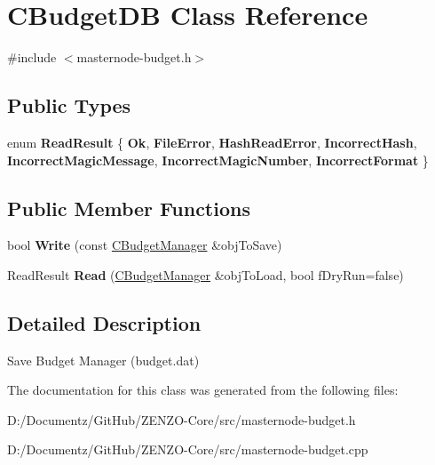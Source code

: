 \hypertarget{class_c_budget_d_b}{}\section{C\+Budget\+DB Class Reference}
\label{class_c_budget_d_b}


{\ttfamily \#include $<$masternode-\/budget.\+h$>$}

\subsection*{Public Types}
\begin{DoxyCompactItemize}
\item 
\mbox{\label{class_c_budget_d_b_a53586703b6648c7cabbf9cdcfef5f7d9}} 
enum {\bfseries Read\+Result} \{ \newline
{\bfseries Ok}, 
{\bfseries File\+Error}, 
{\bfseries Hash\+Read\+Error}, 
{\bfseries Incorrect\+Hash}, 
\newline
{\bfseries Incorrect\+Magic\+Message}, 
{\bfseries Incorrect\+Magic\+Number}, 
{\bfseries Incorrect\+Format}
 \}
\end{DoxyCompactItemize}
\subsection*{Public Member Functions}
\begin{DoxyCompactItemize}
\item 
\mbox{\label{class_c_budget_d_b_a7c9bd15eefe04f87e822cc1bc0887b76}} 
bool {\bfseries Write} (const \mbox{\hyperlink{class_c_budget_manager}{C\+Budget\+Manager}} \&obj\+To\+Save)
\item 
\mbox{\label{class_c_budget_d_b_aecdde2af475070d9fafdcacf93f2e4f2}} 
Read\+Result {\bfseries Read} (\mbox{\hyperlink{class_c_budget_manager}{C\+Budget\+Manager}} \&obj\+To\+Load, bool f\+Dry\+Run=false)
\end{DoxyCompactItemize}


\subsection{Detailed Description}
Save Budget Manager (budget.\+dat) 

The documentation for this class was generated from the following files\+:\begin{DoxyCompactItemize}
\item 
D\+:/\+Documentz/\+Git\+Hub/\+Z\+E\+N\+Z\+O-\/\+Core/src/masternode-\/budget.\+h\item 
D\+:/\+Documentz/\+Git\+Hub/\+Z\+E\+N\+Z\+O-\/\+Core/src/masternode-\/budget.\+cpp\end{DoxyCompactItemize}
